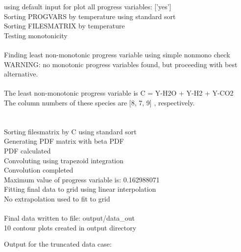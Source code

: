 \documentclass[11pt]{article}
\begin{document}
\hfill\begin{minipage}{\dimexpr\textwidth-3cm}

using default input for plot all progress variables:
['yes'] \\
Sorting PROGVARS by temperature using standard sort \\
Sorting FILESMATRIX by temperature \\
Testing monotonicity  \\
\\
Finding least non-monotonic progress variable using simple nonmono check \\
WARNING: no monotonic progress variables found, but proceeding with best alternative. \\
\\
The least non-monotonic progress variable is C = Y-H2O + Y-H2 + Y-CO2 \\ 
The column numbers of these species are [8, 7, 9] , respectively. \\
\\
\\
Sorting filesmatrix by C using standard sort\\
Generating PDF matrix with beta PDF\\
PDF calculated\\
Convoluting using trapezoid integration\\
Convolution completed\\
Maximum value of progress variable is: 0.162988071\\
Fitting final data to grid using linear interpolation\\
No extrapolation used to fit to grid\\
\\
Final data written to file: output/data\_out \\
10 contour plots created in output directory \\

\xdef\tpd{\the\prevdepth}
\end{minipage}

\vspace{12pt}



Output for the truncated data case:
\end{document}
